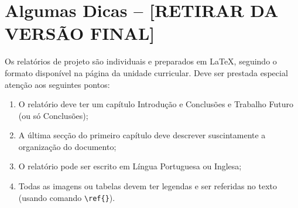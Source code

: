 % 
\section{Algumas Dicas -- [RETIRAR DA VERSÃO FINAL]}
Os relatórios de projeto são individuais e preparados em \LaTeX, seguindo o formato disponível na página da unidade curricular. Deve ser prestada especial atenção aos seguintes pontos:
\begin{enumerate}
  \item O relatório deve ter um capítulo Introdução e Conclusões e Trabalho Futuro (ou só Conclusões);
  \item A última secção do primeiro capítulo deve descrever suscintamente a organização do documento;
  \item O relatório pode ser escrito em Língua Portuguesa ou Inglesa;
  \item Todas as imagens ou tabelas devem ter legendas e ser referidas no texto (usando comando \texttt{\textbackslash ref\{\}}).
\end{enumerate}
